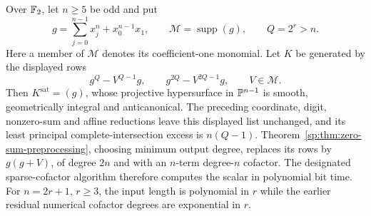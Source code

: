 \begin{example}
\label{sp:ex:zero-sum-family}
Over $\mathbb F_2$, let $n\ge5$ be odd and put
\[
 g=\sum_{j=0}^{n-1}x_j^n+x_0^{n-1}x_1,
 \qquad \mathcal M=\operatorname{supp}(g),
 \qquad Q=2^r>n.
\]
Here a member of $\mathcal M$ denotes its coefficient-one monomial.
Let $K$ be generated by the displayed rows
\begin{equation}
 g^Q-V^{Q-1}g,\qquad
 g^{2Q}-V^{2Q-1}g,
 \qquad V\in\mathcal M.
 \label{sp:eq:zero-sum-family}
\end{equation}
Then $K^{\mathrm{sat}}=(g)$, whose projective hypersurface in
$\mathbb P^{n-1}$ is smooth, geometrically integral and anticanonical.
The preceding coordinate, digit, nonzero-sum and affine reductions
leave this displayed list unchanged, and its least principal
complete-intersection excess is $n(Q-1)$.
Theorem~\ref{sp:thm:zero-sum-preprocessing}, choosing minimum output
degree, replaces its rows by $g(g+V)$, of degree $2n$ and with an
$n$-term degree-$n$ cofactor. The designated sparse-cofactor algorithm
therefore computes the scalar in polynomial bit time.
For $n=2r+1$, $r\ge3$, the input length is polynomial in $r$ while
the earlier residual numerical cofactor degrees are exponential in $r$.
\end{example}
